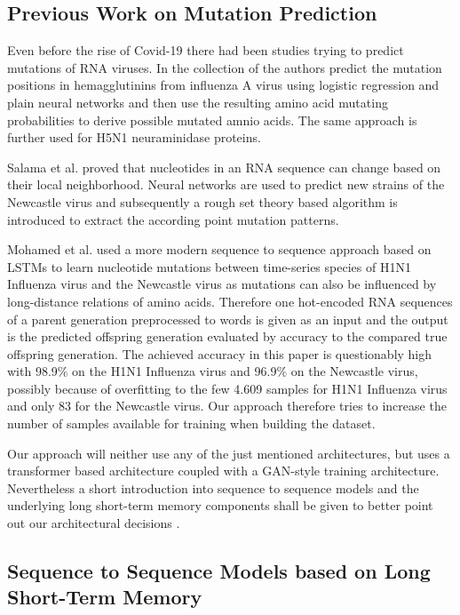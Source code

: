 \subsection{Previous Work on Mutation Prediction} \label{fundamentalsD}

Even before the rise of Covid-19 there had been studies trying to predict mutations of \ac{RNA} viruses. In the collection of \cite{Wu2007, Yan2007, Wu2008} the authors predict the mutation positions in hemagglutinins from influenza A virus using logistic regression and plain neural networks and then use the resulting amino acid mutating probabilities to derive possible mutated amnio acids. The same approach is further used for H5N1 neuraminidase proteins. 

Salama et al. \cite{Salama2016} proved that nucleotides in an \ac{RNA} sequence can change based on their local neighborhood. Neural networks are used to predict new strains of the Newcastle virus and subsequently a rough set theory based algorithm is introduced to extract the according point mutation patterns. 

Mohamed et al. \cite{Mohamed2021} used a more modern sequence to sequence approach based on \acp{LSTM} to learn nucleotide mutations between time-series species of H1N1 Influenza virus and the Newcastle virus as mutations can also be influenced by long-distance relations of amino acids. Therefore one hot-encoded \ac{RNA} sequences of a parent generation preprocessed to words is given as an input and the output is the predicted offspring generation evaluated by accuracy to the compared true offspring generation. The achieved accuracy in this paper is questionably high with 98.9\% on the H1N1 Influenza virus and 96.9\% on the Newcastle virus, possibly because of overfitting to the few 4.609 samples for H1N1 Influenza virus and only 83 for the Newcastle virus. Our approach therefore tries to increase the number of samples available for training when building the dataset. 

Our approach will neither use any of the just mentioned architectures, but uses a transformer based architecture coupled with a GAN-style training architecture. Nevertheless a short introduction into sequence to sequence models and the underlying long short-term memory components shall be given to better point out our architectural decisions . 

\subsection{Sequence to Sequence Models based on Long Short-Term Memory} \label{fundamentalsE}


